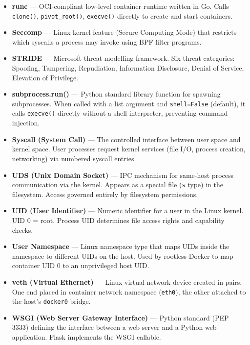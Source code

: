 \begin{itemize}
    \item \textbf{runc} ---
    OCI-compliant low-level container runtime written in Go.
    Calls \texttt{clone()}, \texttt{pivot\_root()},
    \texttt{execve()} directly to create and start containers.

    \item \textbf{Seccomp} ---
    Linux kernel feature (Secure Computing Mode) that restricts
    which syscalls a process may invoke using BPF filter
    programs.

    \item \textbf{STRIDE} ---
    Microsoft threat modelling framework. Six threat categories:
    Spoofing, Tampering, Repudiation, Information Disclosure,
    Denial of Service, Elevation of Privilege.

    \item \textbf{subprocess.run()} ---
    Python standard library function for spawning subprocesses.
    When called with a list argument and \texttt{shell=False}
    (default), it calls \texttt{execve()} directly without a
    shell interpreter, preventing command injection.

    \item \textbf{Syscall (System Call)} ---
    The controlled interface between user space and kernel space.
    User processes request kernel services (file I/O, process
    creation, networking) via numbered syscall entries.

    \item \textbf{UDS (Unix Domain Socket)} ---
    IPC mechanism for same-host process communication via the
    kernel. Appears as a special file (\texttt{s} type) in the
    filesystem. Access governed entirely by filesystem
    permissions.

    \item \textbf{UID (User Identifier)} ---
    Numeric identifier for a user in the Linux kernel.
    UID 0 = root. Process UID determines file access rights
    and capability checks.

    \item \textbf{User Namespace} ---
    Linux namespace type that maps UIDs inside the namespace
    to different UIDs on the host. Used by rootless Docker to
    map container UID 0 to an unprivileged host UID.

    \item \textbf{veth (Virtual Ethernet)} ---
    Linux virtual network device created in pairs. One end
    placed in container network namespace (\texttt{eth0}),
    the other attached to the host's \texttt{docker0} bridge.

    \item \textbf{WSGI (Web Server Gateway Interface)} ---
    Python standard (PEP 3333) defining the interface between
    a web server and a Python web application. Flask implements
    the WSGI callable.

\end{itemize}


